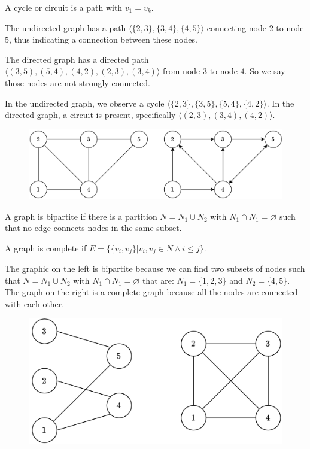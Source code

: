 \begin{definition}      
    A cycle or circuit is a path with $v_1=v_k$.
\end{definition}
\begin{example}
    The undirected graph has a path $\langle \{2,3\},\{3,4\},\{4,5\}\rangle$ connecting node $2$ to node $5$, thus indicating a connection between these nodes.
    
    The directed graph has a directed path $\langle (3,5),(5,4),(4,2),(2,3),(3,4) \rangle$ from node $3$ to node $4$. So we say those nodes are not strongly connected. 
    
    In the undirected graph, we observe a cycle $\langle \{2,3\},\{3,5\},\{5,4\},\{4,2\}\rangle$. 
    In the directed graph, a circuit is present, specifically $\langle (2,3),(3,4),(4,2) \rangle$. 
    \begin{figure}[H]
        \centering
        \includegraphics[width=0.6\linewidth]{images/graph.png}
    \end{figure}
\end{example}
\newpage
\begin{definition}
    A graph is bipartite if there is a partition $N=N_1 \cup N_2$ with $N_1 \cap N_1 = \varnothing$ such that no edge connects nodes in the same subset. 
\end{definition}
\begin{definition}
    A graph is complete if $E=\{ \{v_i,v_j\} | v_i,v_j \in N \land i \leq j \}$.
\end{definition}
\begin{example}
    The graphic on the left is bipartite because we can find two subsets of nodes such that $N=N_1 \cup N_2$ with $N_1 \cap N_1 = \varnothing$ that are: $N_1=\{1,2,3\}$ and $N_2=\{4,5\}$. 
    The graph on the right is a complete graph because all the nodes are connected with each other. 
    \begin{figure}[H]
        \centering
        \includegraphics[width=0.5\linewidth]{images/bipcomp.png}
    \end{figure}
\end{example}
